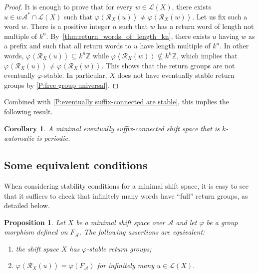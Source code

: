 \documentclass{amsart}
\newcommand*{\ret}{\mathcal{R}}
\newcommand*{\lang}{\mathcal{L}}
\newcommand*{\cA}{\mathcal{A}}
\newcommand*{\gen}[1]{\left\langle #1\right\rangle}
\theoremstyle{plain}
\newtheorem{proposition}[theorem]{Proposition}
\newtheorem{corollary}[theorem]{Corollary}
\theoremstyle{definition}
\theoremstyle{remark}
\begin{document}
\begin{proof}
    It is enough to prove that for every $w \in \lang(X)$, there exists $u \in w\cA^* \cap \lang(X)$ such that $\varphi\gen{\ret_X(u)} \ne \varphi\gen{\ret_X(w)}$.
    Let us fix such a word $w$.
    There is a positive integer $n$ such that $w$ has a return word of length not multiple of $k^n$. 
    By~\cref{thm:return_words_of_length_kn}, there exists $u$ having $w$ as a prefix and such that all return words to $u$ have length multiple of $k^n$.
    In other words, $\varphi\gen{\ret_X(u)} \subseteq k^n\mathbb{Z}$ while $\varphi\gen{\ret_X(w)} \not\subseteq k^n\mathbb{Z}$, which implies that $\varphi\gen{\ret_X(u)} \ne \varphi\gen{\ret_X(w)}$.
    This shows that the return groups are not eventually $\varphi$-stable. In particular, $X$ does not have eventually stable return groups by \cref{P:free group universal}.
\end{proof}

Combined with \cref{P:eventually suffix-connected are stable}, this implies the following result.

\begin{corollary}
    A minimal eventually suffix-connected shift space that is $k$-automatic is periodic.
\end{corollary}

\subsection{Some equivalent conditions}\label{S:subgroup separable}

When considering stability conditions for a minimal shift space, it is easy to see that it suffices to check that infinitely many words have ``full'' return groups, as detailed below.

\begin{proposition}\label{prop:finitely-many}
    Let $X$ be a minimal shift space over $\cA$ and let $\varphi$ be a group morphism defined on $F_\cA$. The following assertions are equivalent:
    \begin{enumerate}
        \item the shift space $X$ has $\varphi$-stable return groups;
        \item $\varphi\gen{\ret_X(u)} = \varphi(F_\cA)$ for infinitely many $u\in\lang(X)$.
    \end{enumerate}
\end{proposition}
\end{document}
